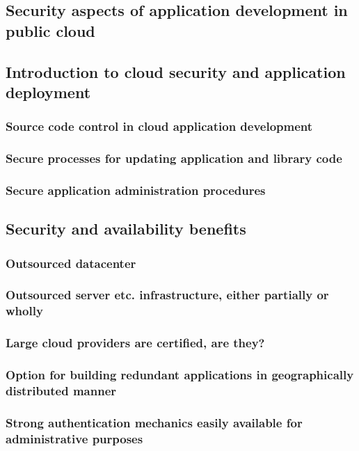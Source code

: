 \documentclass{article}
\begin{document}
\subsection{Security aspects of application development in public cloud}
\blindtext[2]
\subsection{Introduction to cloud security and application deployment}
\blindtext[2]
\subsubsection{Source code control in cloud application development}
\blindtext[2]
\subsubsection{Secure processes for updating application and library code}
\blindtext[2]
\subsubsection{Secure application administration procedures}
\blindtext[2]
\subsection{Security and availability benefits}
\blindtext[2]
\subsubsection{Outsourced datacenter}
\blindtext[2]
\subsubsection{Outsourced server etc. infrastructure, either partially or wholly}
\blindtext[2]
\subsubsection{Large cloud providers are certified, are they?}
\blindtext[2]
\subsubsection{Option for building redundant applications in geographically distributed manner}
\blindtext[2]
\subsubsection{Strong authentication mechanics easily available for administrative purposes}
\blindtext[2]
\end{document}
